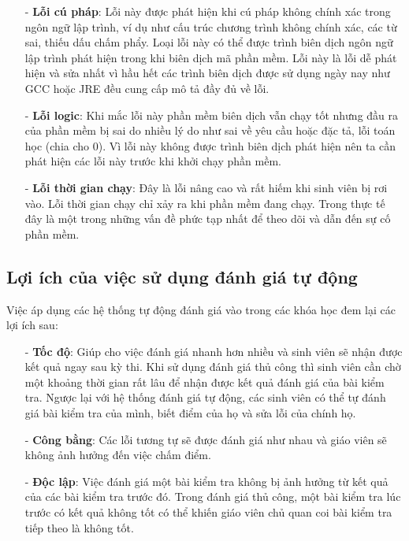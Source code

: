 \documentclass[12pt,a4paper]{article}
\begin{document}
\begin{itemize}
\item[-] \textbf{Lỗi cú pháp}: Lỗi này được phát hiện khi cú pháp không chính xác trong ngôn ngữ lập trình, ví dụ như cấu trúc chương trình không chính xác, các từ sai, thiếu dấu chấm phẩy. Loại lỗi này có thể được trình biên dịch ngôn ngữ lập trình phát hiện trong khi biên dịch mã phần mềm. Lỗi này là lỗi dễ phát hiện và sửa nhất vì hầu hết các trình biên dịch được sử dụng ngày nay như GCC hoặc JRE đều cung cấp mô tả đầy đủ về lỗi.
\item[-] \textbf{Lỗi logic}: Khi mắc lỗi này phần mềm biên dịch vẫn chạy tốt nhưng đầu ra của phần mềm bị sai do nhiều lý do như sai về yêu cầu hoặc đặc tả, lỗi toán học (chia cho 0). Vì lỗi này không được trình biên dịch phát hiện nên ta cần phát hiện các lỗi này trước khi khởi chạy phần mềm.
\item[-] \textbf{Lỗi thời gian chạy}: Đây là lỗi nâng cao và rất hiếm khi sinh viên bị rơi vào. Lỗi thời gian chạy chỉ xảy ra khi phần mềm đang chạy. Trong thực tế đây là một trong những vấn đề phức tạp nhất để theo dõi và dẫn đến sự cố phần mềm.
\end{itemize}
\subsection{Lợi ích của việc sử dụng đánh giá tự động}
Việc áp dụng các hệ thống tự động đánh giá vào trong các khóa học đem lại các lợi ích sau:

\begin{itemize}
\item[-] \textbf{Tốc độ}: Giúp cho việc đánh giá nhanh hơn nhiều và sinh viên sẽ nhận được kết quả ngay sau kỳ thi. Khi sử dụng đánh giá thủ công thì sinh viên cần chờ một khoảng thời gian rất lâu để nhận được kết quả đánh giá của bài kiểm tra. Ngược lại với hệ thống đánh giá tự động, các sinh viên có thể tự đánh giá bài kiểm tra của mình, biết điểm của họ và sửa lỗi của chính họ.
\item[-] \textbf{Công bằng}: Các lỗi tương tự sẽ được đánh giá như nhau và giáo viên sẽ không ảnh hưởng đến việc chấm điểm.
\item[-] \textbf{Độc lập}: Việc đánh giá một bài kiểm tra không bị ảnh hưởng từ kết quả của các bài kiểm tra trước đó. Trong đánh giá thủ công, một bài kiểm tra lúc trước có kết quả không tốt có thể khiến giáo viên chủ quan coi bài kiểm tra tiếp theo là không tốt.
\end{itemize} \newpage
\end{document}
